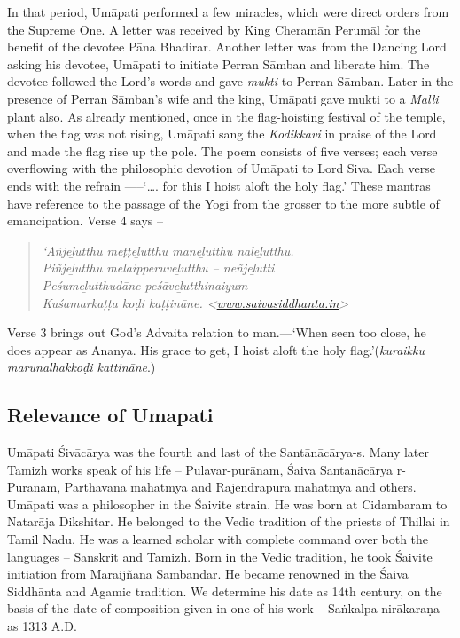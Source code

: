 In that period, Umāpati performed a few miracles, which were direct orders from the Supreme One. A letter was received by King Cheramān Perumāl for the benefit of the devotee Pāna Bhadirar. Another letter was from the Dancing Lord asking his devotee, Umāpati to initiate Perran Sāmban and liberate him. The devotee followed the Lord’s words and gave \textit{mukti }to Perran Sāmban. Later in the presence of Perran Sāmban’s wife and the king, Umāpati gave mukti to a \textit{Malli} plant also. As already mentioned, once in the flag-hoisting festival of the temple, when the flag was not rising, Umāpati sang the \textit{Kodikkavi} in praise of the Lord and made the flag rise up the pole. The poem consists of five verses; each verse overflowing with the philosophic devotion of Umāpati to Lord Siva. Each verse ends with the refrain -----‘…. for this I hoist aloft the holy flag.’ These mantras have reference to the passage of the Yogi from the grosser to the more subtle of emancipation. Verse 4 says –

\begin{quote}
\textit{‘Añjeḻutthu meṭṭeḻutthu māneḻutthu nāleḻutthu. }\\\textit{Piñjeḻutthu melaipperuveḻutthu – neñjeḻutti}\\\textit{Peśumeḻutthudāne peśāveḻutthinaiyum}\\\textit{Kuśamarkaṭṭa koḍi kaṭṭināne. \textless \url{www.saivasiddhanta.in}\textgreater  }
\end{quote}

Verse 3 brings out God’s Advaita relation to man.—‘When seen too close, he does appear as Ananya. His grace to get, I hoist aloft the holy flag.’(\textit{kuraikku marunalhakkoḍi kattināne}.)


\subsection*{Relevance of Umapati}

Umāpati Śivācārya was the fourth and last of the Santānācārya-s. Many later Tamizh works speak of his life – Pulavar-purānam, Śaiva Santanācārya r-Purānam, Pārthavana māhātmya and Rajendrapura māhātmya and others. Umāpati was a philosopher in the Śaivite strain. He was born at Cidambaram to Natarāja Dikshitar. He belonged to the Vedic tradition of the priests of Thillai in Tamil Nadu. He was a learned scholar with complete command over both the languages – Sanskrit and Tamizh. Born in the Vedic tradition, he took Śaivite initiation from Maraijñāna Sambandar. He became renowned in the Śaiva Siddhānta and Agamic tradition. We determine his date as 14th century, on the basis of the date of composition given in one of his work – Saṅkalpa nirākaraṇa as 1313 A.D.

